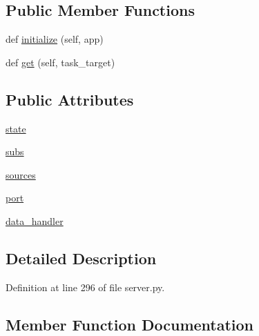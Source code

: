 \subsection*{Public Member Functions}
\begin{DoxyCompactItemize}
\item 
def \hyperlink{classparlai_1_1mturk_1_1webapp_1_1server_1_1RunHandler_abec3206f51ca4edd33ce201ef4131581}{initialize} (self, app)
\item 
def \hyperlink{classparlai_1_1mturk_1_1webapp_1_1server_1_1RunHandler_acf94dbda8676931e2ac205e2c8420b39}{get} (self, task\+\_\+target)
\end{DoxyCompactItemize}
\subsection*{Public Attributes}
\begin{DoxyCompactItemize}
\item 
\hyperlink{classparlai_1_1mturk_1_1webapp_1_1server_1_1RunHandler_a8c691d0a32bac2c64f4cdf8861cfa3fa}{state}
\item 
\hyperlink{classparlai_1_1mturk_1_1webapp_1_1server_1_1RunHandler_a3888f3782c09030eb6eed0bb3734b4c6}{subs}
\item 
\hyperlink{classparlai_1_1mturk_1_1webapp_1_1server_1_1RunHandler_af824a31f541d4421205f883d32ea87fe}{sources}
\item 
\hyperlink{classparlai_1_1mturk_1_1webapp_1_1server_1_1RunHandler_a18313aaf7e807891e1d21b0930639ca9}{port}
\item 
\hyperlink{classparlai_1_1mturk_1_1webapp_1_1server_1_1RunHandler_a55ebe293c2c36001b28f879a256fb03d}{data\+\_\+handler}
\end{DoxyCompactItemize}


\subsection{Detailed Description}


Definition at line 296 of file server.\+py.



\subsection{Member Function Documentation}
\mbox{\label{classparlai_1_1mturk_1_1webapp_1_1server_1_1RunHandler_acf94dbda8676931e2ac205e2c8420b39}} 

